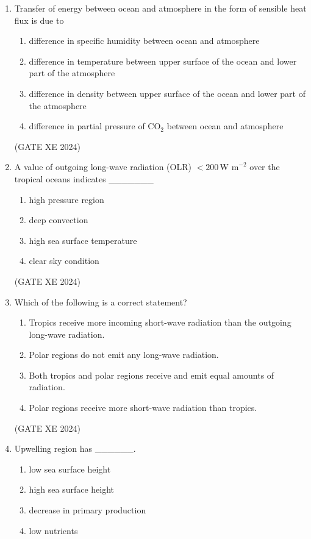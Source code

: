 \documentclass[12pt]{article}
\begin{document}
\begin{enumerate}
(GATE XE 2024)

\item Transfer of energy between ocean and atmosphere in the form of sensible heat flux is due to  

\begin{enumerate}
\item difference in specific humidity between ocean and atmosphere  
\item difference in temperature between upper surface of the ocean and lower part of the atmosphere  
\item difference in density between upper surface of the ocean and lower part of the atmosphere  
\item difference in partial pressure of CO$_2$ between ocean and atmosphere  
\end{enumerate}

(GATE XE 2024)

\item A value of outgoing long-wave radiation (OLR) $< 200 \, \text{W m}^{-2}$ over the tropical oceans indicates \_\_\_\_\_\_\_  

\begin{enumerate}
\item high pressure region  
\item deep convection  
\item high sea surface temperature  
\item clear sky condition  
\end{enumerate}

(GATE XE 2024)

\item Which of the following is a correct statement?  

\begin{enumerate}
\item Tropics receive more incoming short-wave radiation than the outgoing long-wave radiation.  
\item Polar regions do not emit any long-wave radiation.  
\item Both tropics and polar regions receive and emit equal amounts of radiation.  
\item Polar regions receive more short-wave radiation than tropics.  
\end{enumerate}

(GATE XE 2024)

\item Upwelling region has \_\_\_\_\_\_.  

\begin{enumerate}
\item low sea surface height  
\item high sea surface height  
\item decrease in primary production  
\item low nutrients  
\end{enumerate}


\end{enumerate}
\end{document}
